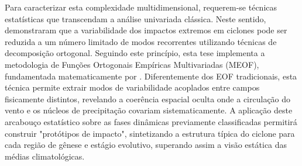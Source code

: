 Para caracterizar esta complexidade multidimensional, requerem-se técnicas estatísticas que transcendam a análise univariada clássica. Neste sentido, \citet{eisenstein2023identification} demonstraram que a variabilidade dos impactos extremos em ciclones pode ser reduzida a um número limitado de modos recorrentes utilizando técnicas de decomposição ortogonal.
Seguindo este princípio, esta tese implementa a metodologia de Funções Ortogonais Empíricas Multivariadas (MEOF), fundamentada matematicamente por \citet{liang2018multivariate}. Diferentemente dos EOF tradicionais, esta técnica permite extrair modos de variabilidade acoplados entre campos fisicamente distintos, revelando a coerência espacial oculta onde a circulação do vento e os núcleos de precipitação covariam sistematicamente.
A aplicação deste arcabouço estatístico sobre as fases dinâmicas previamente classificadas permitirá construir "protótipos de impacto", sintetizando a estrutura típica do ciclone para cada região de gênese e estágio evolutivo, superando assim a visão estática das médias climatológicas.

